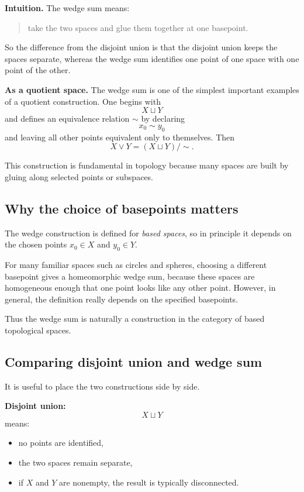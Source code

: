 \documentclass[12pt,a4paper]{article}
\theoremstyle{notespace}
\begin{document}
\medskip

\textbf{Intuition.}
The wedge sum means:
\begin{quote}
	take the two spaces and glue them together at one basepoint.
\end{quote}

So the difference from the disjoint union is that the disjoint union keeps the spaces separate, whereas the wedge sum identifies one point of one space with one point of the other.

\medskip

\textbf{As a quotient space.}
The wedge sum is one of the simplest important examples of a quotient construction. One begins with
\[
X\sqcup Y
\]
and defines an equivalence relation \(\sim\) by declaring
\[
x_0\sim y_0
\]
and leaving all other points equivalent only to themselves. Then
\[
X\vee Y=(X\sqcup Y)/\sim.
\]

This construction is fundamental in topology because many spaces are built by gluing along selected points or subspaces.

\bigskip

\subsection{Why the choice of basepoints matters}

The wedge construction is defined for \emph{based spaces}, so in principle it depends on the chosen points \(x_0\in X\) and \(y_0\in Y\).

For many familiar spaces such as circles and spheres, choosing a different basepoint gives a homeomorphic wedge sum, because these spaces are homogeneous enough that one point looks like any other point. However, in general, the definition really depends on the specified basepoints.

Thus the wedge sum is naturally a construction in the category of based topological spaces.

\bigskip

\subsection{Comparing disjoint union and wedge sum}

It is useful to place the two constructions side by side.

\medskip

\textbf{Disjoint union:}
\[
X\sqcup Y
\]
means:
\begin{itemize}
	\item no points are identified,
	\item the two spaces remain separate,
	\item if \(X\) and \(Y\) are nonempty, the result is typically disconnected.
\end{itemize}
\end{document}
